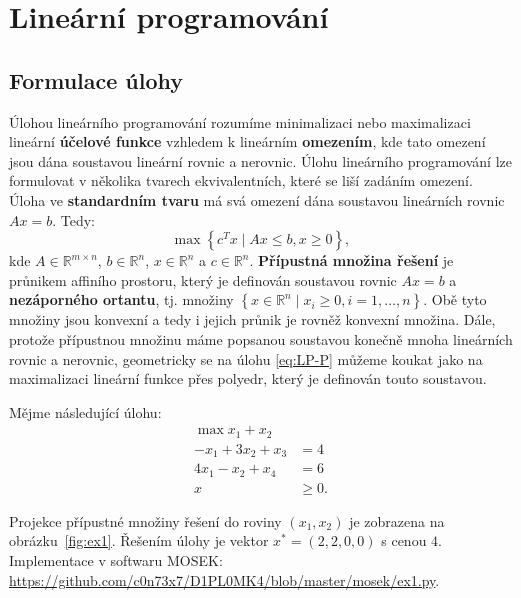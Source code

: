 \chapter{Lineární programování}

\section{Formulace úlohy}

Úlohou lineárního programování rozumíme minimalizaci nebo maximalizaci lineární \textbf{účelové funkce} vzhledem k lineárním \textbf{omezením}, kde tato omezení jsou dána soustavou lineární rovnic a nerovnic. Úlohu lineárního programování lze formulovat v několika tvarech ekvivalentních, které se liší zadáním omezení. Úloha ve \textbf{standardním tvaru} má svá omezení dána soustavou lineárních rovnic $Ax = b$. Tedy:
\begin{equation}\tag{LP-P}
    \max \left\{ c^T x \mid Ax \leq b, x \geq 0 \right\},
    \label{eq:LP-P}
\end{equation}
kde $A \in \mathbb{R}^{m \times n}$, $b \in \mathbb{R}^n$, $x \in \mathbb{R}^n$ a $c \in \mathbb{R}^n$. \textbf{Přípustná množina řešení} je průnikem affiního prostoru, který je definován soustavou rovnic $Ax = b$ a \textbf{nezáporného ortantu}, tj. množiny $\left\{ x \in \mathbb{R}^n \mid x_i \geq 0, i = 1, \dots, n \right\}$. Obě tyto množiny jsou konvexní a tedy i jejich průnik je rovněž konvexní množina. Dále, protože přípustnou množinu máme popsanou soustavou konečně mnoha lineárních rovnic a nerovnic, geometricky se na úlohu \ref{eq:LP-P} můžeme koukat jako na maximalizaci lineární funkce přes polyedr, který je definován touto soustavou.

\begin{pr}
Mějme následující úlohu:
\begin{equation}\tag{P1}
    \begin{split}
        \max x_1 + x_2      & \\
        - x_1 + 3 x_2 + x_3 &= 4 \\
        4 x_1 -   x_2 + x_4 &= 6 \\
        x &\geq 0.
    \end{split}
    \label{eq:P1}
\end{equation}

Projekce přípustné množiny řešení do roviny $(x_1, x_2)$ je zobrazena na obrázku~\ref{fig:ex1}. Řešením úlohy je vektor $x^* = (2, 2, 0, 0)$ s cenou $4$. Implementace v softwaru MOSEK: \url{https://github.com/c0n73x7/D1PL0MK4/blob/master/mosek/ex1.py}.
\end{pr}

